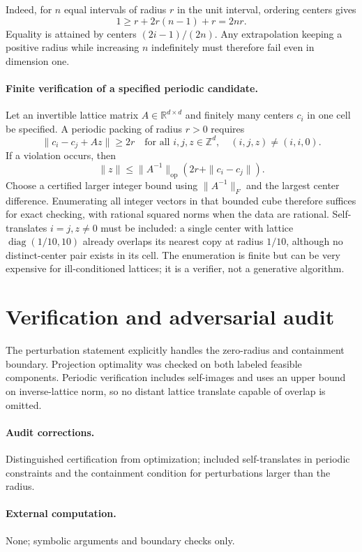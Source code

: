 \documentclass[11pt]{article}
\begin{document}
Indeed, for $n$ equal intervals of radius $r$ in the unit interval, ordering centers gives
\[
1\geq r+2r(n-1)+r=2nr.
\]
Equality is attained by centers $(2i-1)/(2n)$. Any extrapolation keeping a positive radius while increasing $n$ indefinitely must therefore fail even in dimension one.

\paragraph{Finite verification of a specified periodic candidate.}
Let an invertible lattice matrix $A\in\mathbb R^{d\times d}$ and finitely many centers $c_i$ in one cell be specified. A periodic packing of radius $r>0$ requires
\[
\|c_i-c_j+Az\|\geq2r
\quad\text{for all }i,j,z\in\mathbb Z^d,
\quad(i,j,z)\ne(i,i,0).
\]
If a violation occurs, then
\[
\|z\|\leq\|A^{-1}\|_{\mathrm{op}}(2r+\|c_i-c_j\|).
\]
Choose a certified larger integer bound using $\|A^{-1}\|_F$ and the largest center difference. Enumerating all integer vectors in that bounded cube therefore suffices for exact checking, with rational squared norms when the data are rational. Self-translates $i=j,z\ne0$ must be included: a single center with lattice $\operatorname{diag}(1/10,10)$ already overlaps its nearest copy at radius $1/10$, although no distinct-center pair exists in its cell. The enumeration is finite but can be very expensive for ill-conditioned lattices; it is a verifier, not a generative algorithm.
\section{Verification and adversarial audit}
The perturbation statement explicitly handles the zero-radius and containment boundary. Projection optimality was checked on both labeled feasible components. Periodic verification includes self-images and uses an upper bound on inverse-lattice norm, so no distant lattice translate capable of overlap is omitted.
\paragraph{Audit corrections.} Distinguished certification from optimization; included self-translates in periodic constraints and the containment condition for perturbations larger than the radius.
\paragraph{External computation.} None; symbolic arguments and boundary checks only.
\end{document}
